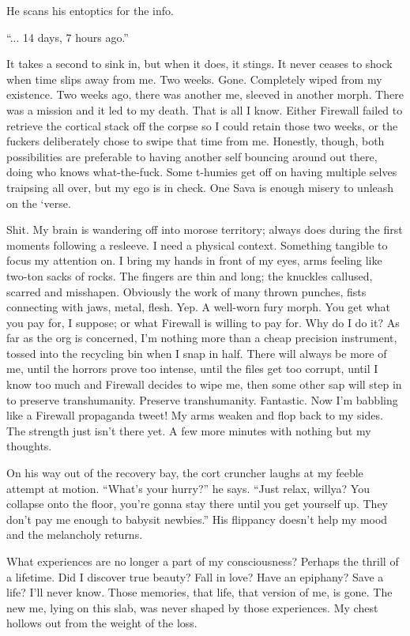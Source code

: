 He scans his entoptics for the info. 

``... 14 days, 7 hours ago.'' 

It takes a second to sink in, but when it does, it stings. It never ceases to shock when time slips away from me. Two weeks. Gone. Completely wiped from my existence. Two weeks ago, there was another me, sleeved in another morph. There was a mission and it led to my death. That is all I know. Either Firewall failed to retrieve the cortical stack off the corpse so I could retain those two weeks, or the fuckers deliberately chose to swipe that time from me. Honestly, though, both possibilities are preferable to having another self bouncing around out there, doing who knows what-the-fuck. Some t-humies get off on having multiple selves traipsing all over, but my ego is in check. One Sava is enough misery to unleash on the ‘verse. 

Shit. My brain is wandering off into morose territory; always does during the first moments following a resleeve. I need a physical context. Something tangible to focus my attention on. I bring my hands in front of my eyes, arms feeling like two-ton sacks of rocks. The fingers are thin and long; the knuckles callused, scarred and misshapen. Obviously the work of many thrown punches, fists connecting with jaws, metal, flesh. Yep. A well-worn fury morph. You get what you pay for, I suppose; or what Firewall is willing to pay for. Why do I do it? As far as the org is concerned, I'm nothing more than a cheap precision instrument, tossed into the recycling bin when I snap in half. There will always be more of me, until the horrors prove too intense, until the files get too corrupt, until I know too much and Firewall decides to wipe me, then some other sap will step in to preserve transhumanity. Preserve transhumanity. Fantastic. Now I'm babbling like a Firewall propaganda tweet! My arms weaken and flop back to my sides. The strength just isn't there yet. A few more minutes with nothing but my thoughts. 

On his way out of the recovery bay, the cort cruncher laughs at my feeble attempt at motion. ``What's your hurry?'' he says. ``Just relax, willya? You collapse onto the floor, you're gonna stay there until you get yourself up. They don't pay me enough to babysit newbies.'' His flippancy doesn't help my mood and the melancholy returns. 

What experiences are no longer a part of my consciousness? Perhaps the thrill of a lifetime. Did I discover true beauty? Fall in love? Have an epiphany? Save a life? I'll never know. Those memories, that life, that version of me, is gone. The new me, lying on this slab, was never shaped by those experiences. My chest hollows out from the weight of the loss. 

